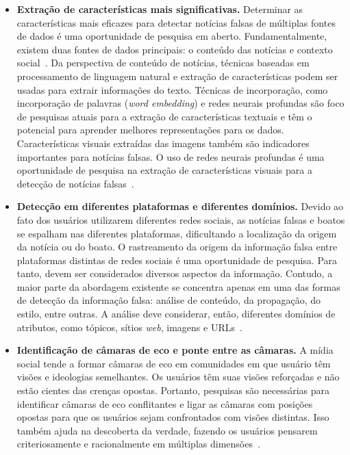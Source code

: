 \documentclass{SBCbookchapter}
\begin{document}
\begin{itemize}
    \item {\bf Extração de características mais significativas.} Determinar as características mais eficazes para detectar notícias falsas de múltiplas fontes de dados é uma oportunidade de pesquisa em aberto. Fundamentalmente, existem duas fontes de dados principais: o conteúdo das notícias e contexto social~\cite{shu2017fake}. Da perspectiva de conteúdo de notícias, técnicas baseadas em processamento de linguagem natural e extração de características podem ser usadas para extrair informações do texto. Técnicas de incorporação, como incorporação de palavras (\textit{word embedding}) e redes neurais profundas são foco de pesquisas atuais para a extração de características textuais e têm o potencial para aprender melhores representações para os dados. Características visuais extraídas das imagens também são indicadores importantes para notícias falsas. O uso de redes neurais profundas é uma oportunidade de pesquisa na extração de características visuais para a detecção de notícias falsas~\cite{sharma2019combating,meel2020}.

    \item {\bf Detecção em diferentes plataformas e diferentes domínios.}  Devido ao fato dos usuários utilizarem diferentes redes sociais, as notícias falsas e boatos se espalham nas diferentes plataformas, dificultando a localização da origem da notícia ou do boato. O rastreamento da origem da informação falsa entre plataformas distintas de redes sociais é uma oportunidade de pesquisa. Para tanto, devem ser considerados diversos aspectos da informação. Contudo, a maior parte da abordagem existente se concentra apenas em uma das formas de detecção da informação falsa: análise de conteúdo, da propagação, do estilo, entre outras. A análise deve considerar, então, diferentes domínios de atributos, como tópicos, sítios \textit{web}, imagens e URLs~\cite{meel2020}.

    \item {\bf Identificação de câmaras de eco e ponte entre as câmaras.}  A mídia social tende a formar câmaras de eco em comunidades em que usuário têm visões e ideologias semelhantes. Os usuários têm suas visões reforçadas e não estão cientes das crenças opostas. Portanto, pesquisas são necessárias para identificar câmaras de eco conflitantes e ligar as câmaras com posições opostas para que os usuários sejam confrontados com visões distintas. Isso também ajuda na descoberta da verdade, fazendo os usuários pensarem criteriosamente e racionalmente em múltiplas dimensões~\cite{meel2020}.


\end{itemize}
\end{document}
